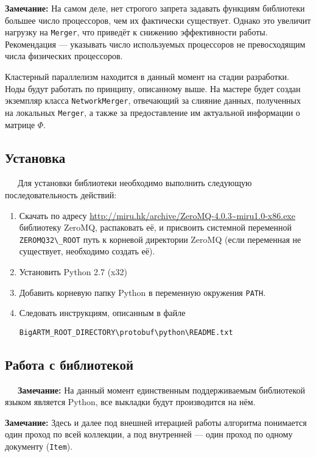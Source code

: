 {\bf Замечание:} На самом деле, нет строгого запрета задавать функциям библиотеки большее число процессоров, чем их фактически существует. Однако это увеличит нагрузку на \verb|Merger|, что приведёт к снижению эффективности работы. Рекомендация --- указывать число используемых процессоров не превосходящим числа физических процессоров.

Кластерный параллелизм находится в данный момент на стадии разработки. Ноды будут работать по принципу, описанному выше. На мастере будет создан экземпляр класса \verb|NetworkMerger|, отвечающий за слияние данных, полученных на локальных \verb|Merger|, а также за предоставление им актуальной информации о матрице $\Phi$.

\subsection{Установка}

$\quad\;\:$Для установки библиотеки необходимо выполнить следующую последовательность действий:

\begin{enumerate}
	\item Скачать по адресу
	\url{http://miru.hk/archive/ZeroMQ-4.0.3~miru1.0-x86.exe}
	библиотеку ZeroMQ, распаковать её, и присвоить системной переменной \verb|ZEROMQ32\_ROOT| путь к корневой директории ZeroMQ (если переменная не существует, необходимо создать её).
	\item Установить Python 2.7 (x32)
	\item Добавить корневую папку Python в переменную окружения \verb|PATH|.
	\item Следовать инструкциям, описанным в файле
	
	\vspace{5pt}
	\verb|BigARTM_ROOT_DIRECTORY\protobuf\python\README.txt| 
\end{enumerate}

\subsection{Работа с библиотекой}

$\quad\;\:${\bf Замечание:} На данный момент единственным поддерживаемым библиотекой языком является Python, все выкладки будут производится на нём.

{\bf Замечание:} Здесь и далее под внешней итерацией работы алгоритма понимается один проход по всей коллекции, а под внутренней --- один проход по одному документу (\verb|Item|). 

